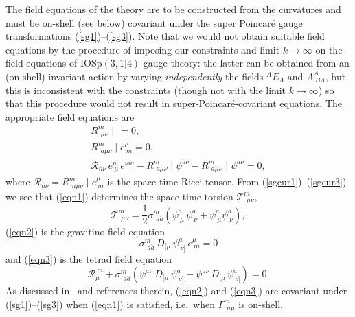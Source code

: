 \documentclass[a4paper,12pt]{article}
\newcommand{\La}{\ensuremath{\Lambda}}
\newcommand{\Ga}{\ensuremath{\Gamma}}
\newcommand{\si}{\ensuremath{\sigma}}
\newcommand{\sfrac}[2]{\ensuremath{{\scriptstyle \frac{#1}{#2}}}}
\begin{document}
The field equations of the theory are to be constructed from the curvatures and must be on-shell (see below) covariant under the super Poincar\'{e} gauge transformations (\ref{sg1})--(\ref{sg3}). Note that we would not obtain suitable field equations by the procedure of imposing our constraints and limit $k\to\infty$ on the field equations of IOSp$(3,1|4)$ gauge theory: the latter can be obtained from an (on-shell) invariant action by varying {\it independently} the fields $^A\!E_\La$ and $A^A_{\ B\La}$, but this is inconsistent with the constraints (though not with the limit $k\to\infty$) so that this procedure would not result in super-Poincar\'{e}-covariant equations. The appropriate field equations are
\begin{gather}
R^m_{\ \,\mu\nu}\!\!\mid\,=0, \label{eqn1} \\
R^m_{\ \,\dot{a}\mu\nu}\!\!\mid e^\mu_{\ m}=0, \label{eqn2} \\
\mathcal{R}_{n\nu}\,e^n_{\ \mu}\,e^{\nu m}-R^m_{\ \,\dot{a}\mu\nu}\!\!\mid\psi^{\dot{a}\nu}-R^m_{\ \,a\mu\nu}\!\!\mid\psi^{a\nu}=0, \label{eqn3}
\end{gather}
where $\mathcal{R}_{n\nu}=R^m_{\ \,n\mu\nu}\!\!\mid e^\mu_{\ m}$ is the space-time Ricci tensor. From (\ref{sgcur1})--(\ref{sgcur3}) we see that (\ref{eqn1}) determines the space-time torsion $\mathcal{T}^m_{\ \,\mu\nu}$,
\[
\mathcal{T}^m_{\ \,\mu\nu}=\sfrac{1}{2}\si^m_{\ \,a\dot{a}}(\psi^a_{\ \mu}\,\psi^{\dot{a}}_{\ \nu}+\psi^{\dot{a}}_{\ \mu}\psi^a_{\ \nu}),
\]
(\ref{eqn2}) is the gravitino field equation
\[
\si^m_{\ \,a\dot{a}}\,D_{[\mu}\,\psi^a_{\ \nu]}\,e^\mu_{\ m}=0
\]
and (\ref{eqn3}) is the tetrad field equation
\[
\mathcal{R}_{\mu}^{\ m}+\si^m_{\ \,a\dot{a}}(\psi^{\dot{a}\nu}\,D_{[\mu}\,\psi^a_{\ \nu]}+\psi^{a\nu}\,D_{[\mu}\,\psi^{\dot{a}}_{\ \nu]})=0.
\]
As discussed in~\cite{sal} and references therein, (\ref{eqn2}) and (\ref{eqn3}) are covariant under (\ref{sg1})--(\ref{sg3}) when (\ref{eqn1}) is satisfied, i.e.\ when $\Ga^m_{\ \,n\mu}$ is on-shell.
\end{document}
